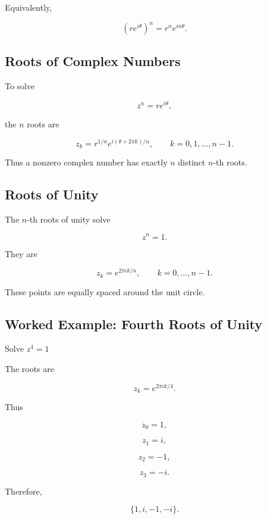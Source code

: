 Equivalently,

\[
\boxed{
(re^{i\theta})^n
=
r^ne^{in\theta}.
}
\]

\subsection{Roots of Complex Numbers}
\label{subsec:complex-roots-reference}

To solve

\[
z^n
=
re^{i\theta},
\]

the \(n\) roots are

\[
\boxed{
z_k
=
r^{1/n}
e^{
i(\theta+2\pi k)/n
},
\qquad
k=0,1,\ldots,n-1.
}
\]

Thus a nonzero complex number has exactly \(n\) distinct \(n\)-th roots.

\subsection{Roots of Unity}
\label{subsec:roots-of-unity-reference}

The \(n\)-th roots of unity solve

\[
\boxed{
z^n=1.
}
\]

They are

\[
\boxed{
z_k
=
e^{2\pi i k/n},
\qquad
k=0,\ldots,n-1.
}
\]

These points are equally spaced around the unit circle.

\subsection{Worked Example: Fourth Roots of Unity}
\label{subsec:worked-fourth-roots-unity}

\begin{workedexamplebox}{Solve \(z^4=1\)}

The roots are

\[
z_k
=
e^{2\pi i k/4}.
\]

Thus

\[
z_0=1,
\]

\[
z_1=i,
\]

\[
z_2=-1,
\]

\[
z_3=-i.
\]

Therefore,

\begin{answerbox}
\[
\boxed{
\{1,i,-1,-i\}.
}
\]
\end{answerbox}

\end{workedexamplebox}

